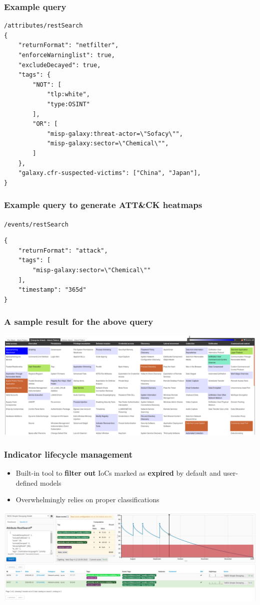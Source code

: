 \begin{frame}[fragile]
    \frametitle{Example query}
    \begin{lstlisting}
/attributes/restSearch
{
    "returnFormat": "netfilter",
    "enforceWarninglist": true,
    "excludeDecayed": true,
    "tags": {
        "NOT": [
            "tlp:white",
            "type:OSINT"
        ],
        "OR": [
            "misp-galaxy:threat-actor=\"Sofacy\"",
            "misp-galaxy:sector=\"Chemical\"",
        ]
    },
    "galaxy.cfr-suspected-victims": ["China", "Japan"],
}\end{lstlisting}
\end{frame}

\begin{frame}[fragile]
    \frametitle{Example query to generate ATT\&CK heatmaps}
    \texttt{/events/restSearch}
    \begin{lstlisting}
{
    "returnFormat": "attack",
    "tags": [
        "misp-galaxy:sector=\"Chemical\""
    ],
    "timestamp": "365d"
}
    \end{lstlisting}
\end{frame}

\begin{frame}
  \frametitle{A sample result for the above query}
  \begin{center}
    \includegraphics[scale=0.2]{pics/attack-screenshot.png}
  \end{center}
\end{frame}

\begin{frame}
\frametitle{Indicator lifecycle management}
    \begin{itemize}
        \item Built-in tool to {\bf filter out} IoCs marked as {\bf expired} by default and user-defined models
        \item Overwhelmingly relies on proper classifications
    \end{itemize}
    \hspace{-1.5em}
    \includegraphics[width=1.1\linewidth]{pics/decaying-simulation}
\end{frame}


